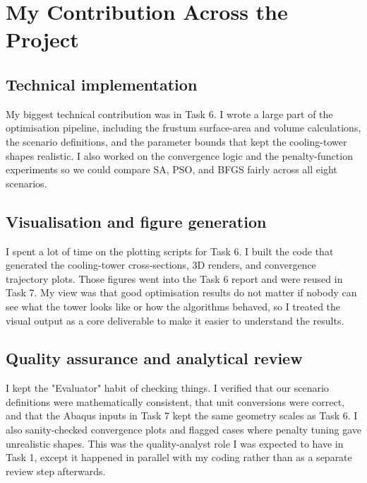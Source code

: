 \chapter{My Contribution Across the Project}


\section{Technical implementation}


\noindent My biggest technical contribution was in Task 6. I wrote a large part of the optimisation pipeline, including the frustum surface-area and volume calculations, the scenario definitions, and the parameter bounds that kept the cooling-tower shapes realistic. I also worked on the convergence logic and the penalty-function experiments so we could compare SA, PSO, and BFGS fairly across all eight scenarios.


\section{Visualisation and figure generation}


\noindent I spent a lot of time on the plotting scripts for Task 6. I built the code that generated the cooling-tower cross-sections, 3D renders, and convergence trajectory plots. Those figures went into the Task 6 report and were reused in Task 7. My view was that good optimisation results do not matter if nobody can see what the tower looks like or how the algorithms behaved, so I treated the visual output as a core deliverable to make it easier to understand the results.


\section{Quality assurance and analytical review}


\noindent I kept the "Evaluator" habit of checking things. I verified that our scenario definitions were mathematically consistent, that unit conversions were correct, and that the Abaqus inputs in Task 7 kept the same geometry scales as Task 6. I also sanity-checked convergence plots and flagged cases where penalty tuning gave unrealistic shapes. This was the quality-analyst role I was expected to have in Task 1, except it happened in parallel with my coding rather than as a separate review step afterwards.


